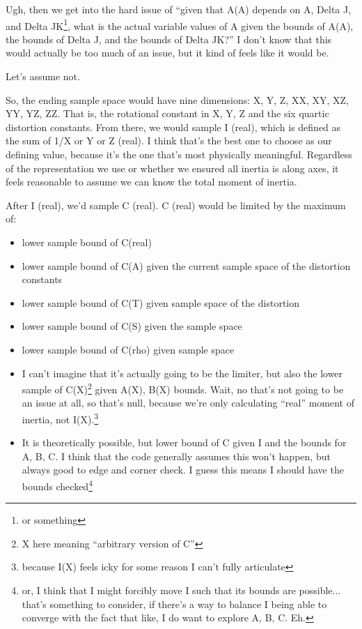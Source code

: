 \documentclass[12pt]{article}
\newcommand{\say}[1]{``#1''}
\renewcommand{\,}{\textsuperscript{,}}
\begin{document}
Ugh, then we get into the hard issue of \say{given that A(A) depends on A, Delta J, and Delta JK\footnote{or something}, what is the actual variable values of A given the bounds of A(A), the bounds of Delta J, and the bounds of Delta JK?}  
I don't know that this would actually be too much of an issue, but it kind of feels like it would be.

Let's assume not.

So, the ending sample space would have nine dimensions: X, Y, Z, XX, XY, XZ, YY, YZ, ZZ.  
That is, the rotational constant in X, Y, Z and the six quartic distortion constants.  
From there, we would sample I (real), which is defined as the sum of 1/X or Y or Z (real).  
I think that's the best one to choose as our defining value, because it's the one that's most physically meaningful.  
Regardless of the representation we use or whether we ensured all inertia is along axes, it feels reasonable to assume we can know the total moment of inertia.

After I (real), we'd sample C (real).  
C (real) would be limited by the maximum of:  
\begin{itemize}  
\item lower sample bound of C(real)  
\item lower sample bound of C(A) given the current sample space of the distortion constants  
\item lower sample bound of C(T) given sample space of the distortion  
\item lower sample bound of C(S) given the sample space  
\item lower sample bound of C(rho) given sample space  
\item I can't imagine that it's actually going to be the limiter, but also the lower sample of C(X)\footnote{X here meaning \say{arbitrary version of C}} given A(X), B(X) bounds. Wait, no that's not going to be an issue at all, so that's null, because we're only calculating \say{real} moment of inertia, not I(X).\footnote{because I(X) feels icky for some reason I can't fully articulate}  
\item It is theoretically possible, but lower bound of C given I and the bounds for A, B, C. I think that the code generally assumes this won't happen, but always good to edge and corner check. I guess this means I should have the bounds checked\footnote{or, I think that I might forcibly move I such that its bounds are possible... that's something to consider, if there's a way to balance I being able to converge with the fact that like, I do want to explore A, B, C. Eh.}  
\end{itemize}
\end{document}
